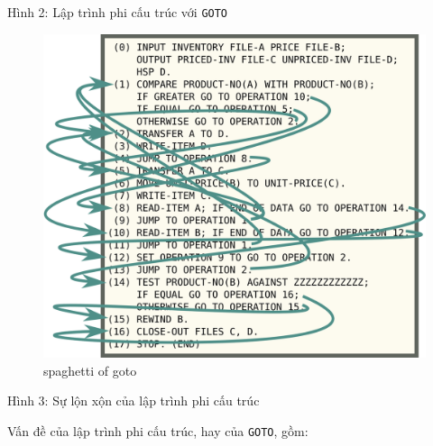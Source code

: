\documentclass[
]{article}
\begin{document}
Hình 2: Lập trình phi cấu trúc với \texttt{GOTO}

\begin{figure}
\centering
\includegraphics{../images/flow-matic-4.svg}
\caption{spaghetti of goto}
\end{figure}

Hình 3: Sự lộn xộn của lập trình phi cấu trúc

Vấn đề của lập trình phi cấu trúc, hay của \texttt{GOTO}, gồm:
\end{document}
